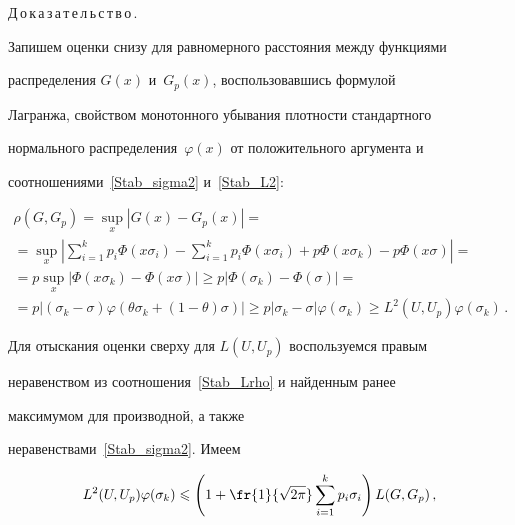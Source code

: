 \medskip



\noindent

Д\,о\,к\,а\,з\,а\,т\,е\,л\,ь\,с\,т\,в\,о\,.\

Запишем оценки снизу для равномерного расстояния между функциями

распределения $G(x)$ и~$G_p(x)$, воспользовавшись формулой

Лагранжа, свойством монотонного убывания плотности стандартного

нормального распределения~$\varphi(x)$ от положительного аргумента и

соотношениями~\eqref{Stab_sigma2} и~\eqref{Stab_L2}:

\begin{multline*}

\rho(G,G_p)=\sup\limits_x|G(x)-G_p(x)|={}\\

{}=\sup\limits_x\left|\sum\limits_{i=1}^k

p_i\Phi(x\sigma_i)-\sum\limits_{i=1}^k

p_i\Phi(x\sigma_i)+p\Phi(x\sigma_k)-p\Phi(x\sigma)\right|={}\\

{}=p\sup\limits_x|\Phi(x\sigma_k)-\Phi(x\sigma)|\geqslant

p|\Phi(\sigma_k)-\Phi(\sigma)|={}\\

{}=p|(\sigma_k-\sigma)\varphi(\theta\sigma_k+(1-\theta)\sigma)|\geqslant p|

\sigma_k-\sigma|\varphi(\sigma_k)\geqslant

L^2(U,U_p)\varphi(\sigma_k)\,.

\end{multline*}



Для отыскания оценки сверху для $L(U,U_p)$ воспользуемся правым

неравенством из соотношения~\eqref{Stab_Lrho} и найденным ранее

максимумом для производной, а также

неравенствами~\eqref{Stab_sigma2}. Имеем

\begin{equation*}

L^2(U,U_p)\varphi(\sigma_k)\leqslant\left(1+\fr{1}{\sqrt{2\pi}}\sum\limits_{i=1}^k

p_i\sigma_i\right)L(G,G_p)\,,

\end{equation*}

